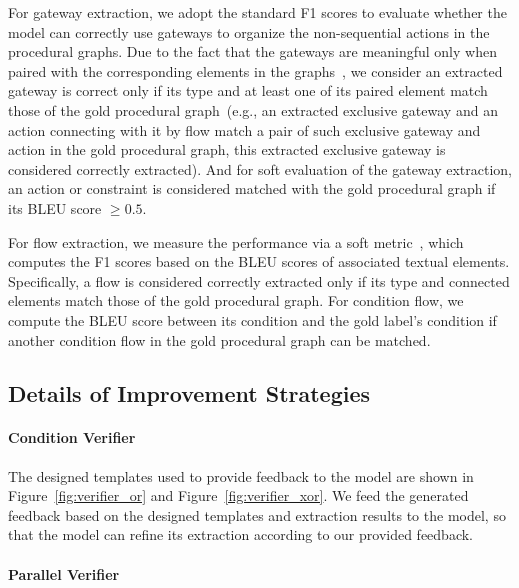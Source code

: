For gateway extraction, we adopt the standard F1 scores to evaluate whether the model can correctly use gateways to organize the non-sequential actions in the procedural graphs. Due to the fact that the gateways are meaningful only when paired with the corresponding elements in the graphs~\cite{von2015business, dumas2018fundamentals}, we consider an extracted gateway is correct only if its type and at least one of its paired element match those of the gold procedural graph~(e.g., an extracted exclusive gateway and an action connecting with it by flow match a pair of such exclusive gateway and action in the gold procedural graph, this extracted exclusive gateway is considered correctly extracted). And for soft evaluation of the gateway extraction, an action or constraint is considered matched with the gold procedural graph if its BLEU score $\geq 0.5$.

For flow extraction, we measure the performance via a soft metric~\cite{tandon-etal-2020-dataset}, which computes the F1 scores based on the BLEU scores of associated textual elements.
Specifically, a flow is considered correctly extracted only if its type and connected elements match those of the gold procedural graph. For condition flow, we compute the BLEU score between its condition and the gold label's condition if another condition flow in the gold procedural graph can be matched.


\subsection{Details of Improvement Strategies
}

\label{app:ProposedMethod}
%
\paragraph{Condition Verifier}

The designed templates used to provide feedback to the model are shown in Figure~\ref{fig:verifier_or} and Figure~\ref{fig:verifier_xor}.
We feed the generated feedback based on the designed templates and extraction results to the model, so that the model can refine its extraction according to our provided feedback.

\paragraph{Parallel Verifier}

